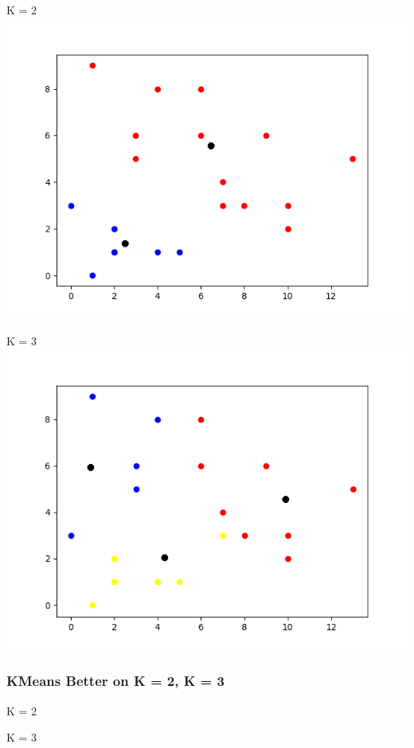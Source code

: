 \documentclass{article}
\begin{document}
	\begin{center}
		K = 2
		\includegraphics[scale=.8]{KMeans_K=2C.png}
	\end{center}
	\begin{center}
			K = 3
			\includegraphics[scale=.8]{KMeans_K=3C.png}
	\end{center}
	
	\subsubsection{KMeans Better on K = 2, K = 3}
	\begin{center}
		K = 2
	\end{center}
	\begin{center}
		K = 3
	\end{center}
	
\end{document}
